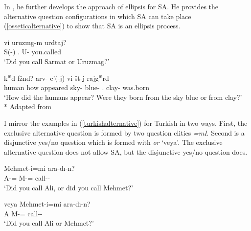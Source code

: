 In \citet{erschler2018suspended}, he further develops the approach of ellipsis for SA. He provides the alternative question configurations in which SA can take place (\ref{osseticalternative}) to show that SA is an ellipsis process.

\begin{exe}
    \ex \label{osseticalternative}
    \begin{xlist}
        \ex {} {\textturna vi} {uruzm\textturna g-m\textturna} {\textdzlig urdtaj?} \\ 
        S(-{\All}) {\Or}.{\Q} U-{\All} you.called \\ 
        \glt `Did you call Sarmat or Uruzmag?'
        
        \ex {} {k$^w$\textschwa d} {f\textturna\v{z}\textschwa nd?} {arv-\textschwa} {c'\textturna\textinvscr(-\textturna j)} {\textturna vi} {\v{s}\textschwa\textdyoghlig\textschwa t-\textturna j} {rajg$^w$\textschwa rd} \\ 
        human how appeared sky-{\Obl} blue-{\Abl} {\Or}.{\Q} clay-{\Abl} was.born \\
        \glt `How did the humans appear? Were they born from the sky blue or from clay?'\\*
        \hfill Adapted from \citet{erschler2018suspended}
    \end{xlist}
\end{exe}

I mirror the examples in (\ref{turkishalternative}) for Turkish in two ways. First, the exclusive alternative question is formed by two question clitics \textit{=mI}. Second is a disjunctive yes/no question which is formed with \textit{or} `veya'. The exclusive alternative question does not allow SA, but the disjunctive yes/no question does.

\begin{exe}
    \ex \label{turkishalternative}
    \begin{xlist}
    \ex {} {Mehmet-i=mi} {ara-dı-n?} \\ 
    A-{\Acc}={\Q} M-{\Acc}={\Q} call-{\Pst}-{\Ssg} \\
    \glt `Did you call Ali, or did you call Mehmet?'
    
    \ex {} {veya} {Mehmet-i=mi} {ara-dı-n?} \\
    A {\Or} M-{\Acc}={\Q} call-{\Pst}-{\Ssg} \\
    \glt `Did you call Ali or Mehmet?'
    \end{xlist}
\end{exe}

